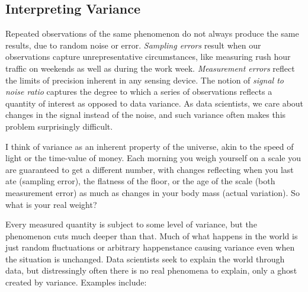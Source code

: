 \documentclass[10pt]{article}
\begin{document}
\subsection{Interpreting Variance}
Repeated observations of the same phenomenon do not always produce the same results, due to random noise or error. \textit{Sampling errors} result when our observations capture unrepresentative circumstances, like measuring rush hour traffic on weekends as well as during the work week. \textit{Measurement errors} reflect the limits of precision inherent in any sensing device. The notion of \textit{signal to noise ratio} captures the degree to which a series of observations reflects a quantity of interest as opposed to data variance. As data scientists, we care about changes in the signal instead of the noise, and such variance often makes this problem surprisingly difficult.

I think of variance as an inherent property of the universe, akin to the speed of light or the time-value of money. Each morning you weigh yourself on a scale you are guaranteed to get a different number, with changes reflecting when you last ate (sampling error), the flatness of the floor, or the age of the scale (both measurement error) as much as changes in your body mass (actual variation). So what is your real weight?

Every measured quantity is subject to some level of variance, but the phenomenon cuts much deeper than that. Much of what happens in the world is just random fluctuations or arbitrary happenstance causing variance even when the situation is unchanged. Data scientists seek to explain the world through data, but distressingly often there is no real phenomena to explain, only a ghost created by variance. Examples include:
\end{document}
